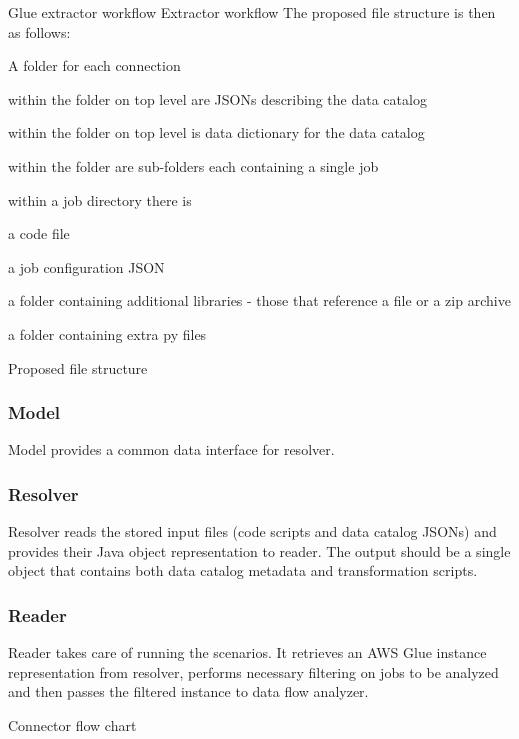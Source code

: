 Glue extractor workflow
Extractor workflow
The proposed file structure is then as follows:

A folder for each connection

within the folder on top level are JSONs describing the data catalog

within the folder on top level is data dictionary for the data catalog

within the folder are sub-folders each containing a single job

within a job directory there is

a code file

a job configuration JSON

a folder containing additional libraries - those that reference a file or a zip archive

a folder containing extra py files


Proposed file structure
\subsubsection{Model}
Model provides a common data interface for resolver. 

\subsubsection{Resolver}
Resolver reads the stored input files (code scripts and data catalog JSONs) and provides their Java object representation to reader. The output should be a single object that contains both data catalog metadata and transformation scripts.

\subsubsection{Reader}
Reader takes care of running the scenarios. It retrieves an AWS Glue instance representation from resolver, performs necessary filtering on jobs to be analyzed and then passes the filtered instance to data flow analyzer.

Connector flow chart

 

 